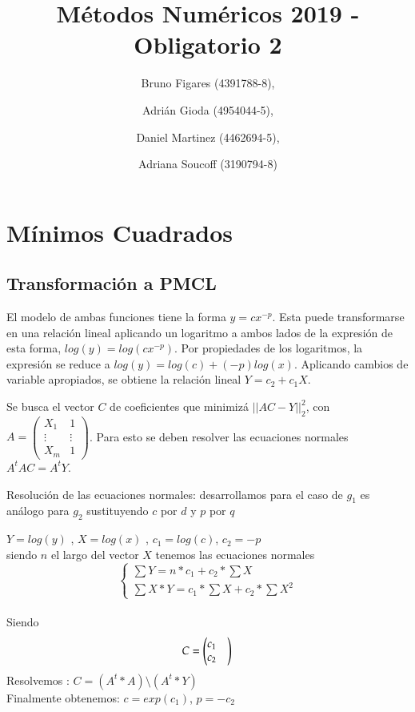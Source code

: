 \documentclass{endm}
\begin{document}
\begin{frontmatter}

\title{Métodos Numéricos 2019 - Obligatorio 2}

\author{Bruno Figares (4391788-8),}
\author{Adrián Gioda (4954044-5),}
\author{Daniel Martinez (4462694-5),}
\author{Adriana Soucoff (3190794-8)}

\address{Instituto de Matem\'atica y Estad\'istica\\ Facultad de Ingenier\'ia. Universidad de la Rep\'ublica\\ Montevideo, Uruguay}

\end{frontmatter}


\section{Mínimos Cuadrados}
\subsection{Transformación a PMCL}
El modelo de ambas funciones tiene la forma $y = cx^{-p}$. Esta puede transformarse en una relación
lineal aplicando un logaritmo a ambos lados de la expresión de esta forma, $log(y) = log(cx^{-p})$.
Por propiedades de los logaritmos, la expresión se reduce a $log(y) = log(c) + (-p)log(x)$.
Aplicando cambios de variable apropiados, se obtiene la relación lineal $Y = c_2 + c_1X$.

Se busca el vector $C$ de coeficientes que minimizá $||AC - Y||^2_2$,
con $A = \begin{pmatrix}X_1 & 1 \\ \vdots & \vdots \\ X_m & 1 \end{pmatrix}$.
Para esto se deben resolver las ecuaciones normales $A^tAC = A^tY$.

Resolución de las ecuaciones normales:
desarrollamos para el caso de $g_{1}$ es análogo para $g_{2}$ sustituyendo $c$ por $d$ y $p$ por $q$ 

$Y =log(y)$ , $X =log(x)$ , $c_1= log(c)$, $c_2= -p$ \\
siendo $n$ el largo del vector $X$ tenemos las ecuaciones normales
\begin{equation}
\begin{cases}
\sum Y = n * c_1 + c_2 * \sum X \\
\sum X * Y = c_1 * \sum X + c_2 * \sum X^2
\end{cases}
\end{equation}  \\
Siendo \begin{equation*}C=\begin{pmatrix}
          c_1 & \\
          c_2
         \end{pmatrix} \\
\end{equation*}
Resolvemos : $ C=(A^t * A) \setminus  (A^t * Y)$ \\
Finalmente obtenemos:  $c= exp(c_1)$, $p = -c_2$ \\
\end{document}
